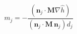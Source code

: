 $$
m_j = - \frac{\left(\mathbf n_j\cdot \mathbf M\nabla\hat h\right)}{\left(\mathbf n_j\cdot \mathbf M\,\mathbf n_j\right) d_j}
$$
